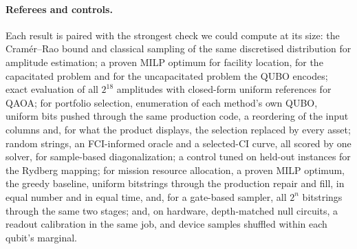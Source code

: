 \documentclass[11pt,a4paper]{article}
\begin{document}
\paragraph{Referees and controls.} Each result is paired with the strongest
check we could compute at its size: the Cram\'er--Rao bound and classical
sampling of the same discretised distribution for amplitude estimation; a
proven MILP optimum for facility location, for the capacitated problem and
for the uncapacitated problem the QUBO encodes; exact evaluation of all
$2^{18}$ amplitudes with closed-form uniform references for QAOA; for
portfolio selection, enumeration of each method's own QUBO, uniform bits
pushed through the same production code, a reordering of the input
columns and, for what the product displays, the selection replaced by
every asset; random
strings, an FCI-informed oracle and a selected-CI curve, all scored by one
solver, for sample-based diagonalization; a control tuned on held-out
instances for the Rydberg mapping; for mission resource allocation, a
proven MILP optimum, the greedy baseline, uniform bitstrings through the
production repair and fill, in equal number and in equal time, and, for a
gate-based sampler, all $2^n$
bitstrings through the same two stages; and, on hardware, depth-matched null
circuits, a readout calibration in the same job, and device samples shuffled
within each qubit's marginal.
\end{document}
